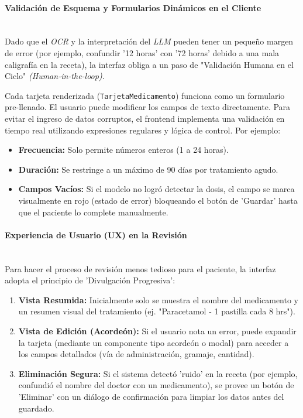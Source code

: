 \paragraph{Validación de Esquema y Formularios Dinámicos en el Cliente}\leavevmode \\
Dado que el \emph{OCR} y la interpretación del \emph{LLM} pueden tener un pequeño margen de error (por ejemplo, confundir '12 horas' con '72 horas' debido a una mala caligrafía en la receta), la interfaz obliga a un paso de "Validación Humana en el Ciclo" \emph{(Human-in-the-loop)}.

Cada tarjeta renderizada (\texttt{TarjetaMedicamento}) funciona como un formulario pre-llenado. El usuario puede modificar los campos de texto directamente. Para evitar el ingreso de datos corruptos, el frontend implementa una validación en tiempo real utilizando expresiones regulares y lógica de control. Por ejemplo:
\begin{itemize}
    \item \textbf{Frecuencia:} Solo permite números enteros (1 a 24 horas).
    \item \textbf{Duración:} Se restringe a un máximo de 90 días por tratamiento agudo.
    \item \textbf{Campos Vacíos:} Si el modelo no logró detectar la dosis, el campo se marca visualmente en rojo (estado de error) bloqueando el botón de 'Guardar' hasta que el paciente lo complete manualmente.
\end{itemize}

\paragraph{Experiencia de Usuario (UX) en la Revisión}\leavevmode \\
Para hacer el proceso de revisión menos tedioso para el paciente, la interfaz adopta el principio de 'Divulgación Progresiva':
\begin{enumerate}
    \item \textbf{Vista Resumida:} Inicialmente solo se muestra el nombre del medicamento y un resumen visual del tratamiento (ej. "Paracetamol - 1 pastilla cada 8 hrs").
    \item \textbf{Vista de Edición (Acordeón):} Si el usuario nota un error, puede expandir la tarjeta (mediante un componente tipo acordeón o modal) para acceder a los campos detallados (vía de administración, gramaje, cantidad).
    \item \textbf{Eliminación Segura:} Si el sistema detectó 'ruido' en la receta (por ejemplo, confundió el nombre del doctor con un medicamento), se provee un botón de 'Eliminar' con un diálogo de confirmación para limpiar los datos antes del guardado.
\end{enumerate}

